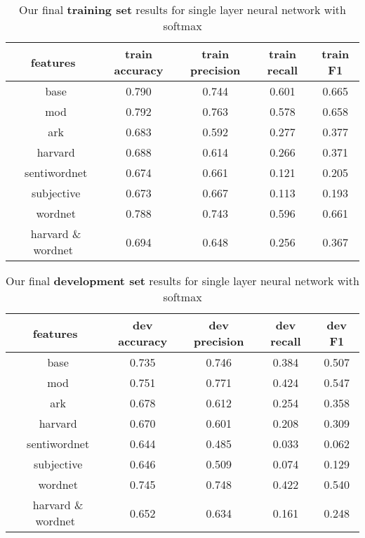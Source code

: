 \documentclass[11pt,letterpaper]{article}
\begin{document}
\begin{table}
\begin{center}
\begin{tabularx}{374pt}{|c|c|c|c|c|}
\hline
\bf features & \bf train accuracy & \bf train precision &\bf train recall &\bf train F1 \\
\hline
\ base & 0.790 & 0.744 & 0.601 & 0.665 \\
\ mod & 0.792 & 0.763 & 0.578 & 0.658 \\
\ ark & 0.683 & 0.592 & 0.277 & 0.377 \\
\ harvard & 0.688 & 0.614 & 0.266 & 0.371 \\
\ sentiwordnet & 0.674 & 0.661 & 0.121 & 0.205 \\
\ subjective & 0.673 & 0.667 & 0.113 & 0.193 \\
\ wordnet & 0.788 & 0.743 & 0.596 & 0.661 \\
\ harvard \& wordnet & 0.694 & 0.648 & 0.256 & 0.367 \\
\hline
\end{tabularx}
\end{center}
\caption{\label{final-results-train} Our final {\bf training set} results for single layer neural network with softmax }
\end{table}

\begin{table}
\begin{center}
\begin{tabularx}{347pt}{|c|c|c|c|c|}
\hline
\bf features & \bf dev accuracy &\bf dev precision &\bf dev recall & \bf dev F1 \\
\hline
\ base & 0.735 & 0.746 & 0.384 & 0.507 \\
\ mod & 0.751 & 0.771 & 0.424 & 0.547 \\
\ ark & 0.678 & 0.612 & 0.254 & 0.358 \\
\ harvard & 0.670 & 0.601 & 0.208 & 0.309 \\
\ sentiwordnet & 0.644 & 0.485 & 0.033 & 0.062 \\
\ subjective & 0.646 & 0.509 & 0.074 & 0.129 \\
\ wordnet & 0.745 & 0.748 & 0.422 & 0.540 \\
\ harvard \& wordnet & 0.652 & 0.634 & 0.161 & 0.248 \\
\hline
\end{tabularx}
\end{center}
\caption{\label{final-results-dev} Our final {\bf development set} results for single layer neural network with softmax }
\end{table}
\end{document}
